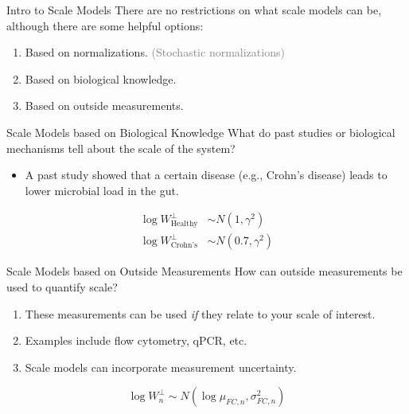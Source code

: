 \documentclass[
  ignorenonframetext,
]{beamer}
\providecommand{\tightlist}{%
  \setlength{\itemsep}{0pt}\setlength{\parskip}{0pt}}
\begin{document}
\begin{frame}{Intro to Scale Models}
\protect\hypertarget{intro-to-scale-models}{}
There are no restrictions on what scale models can be, although there
are some helpful options:

\vspace{.125in}

\begin{enumerate}
\tightlist
\item
  Based on normalizations. \textcolor{gray}{(Stochastic normalizations)}
\item
  Based on biological knowledge.
\item
  Based on outside measurements.
\end{enumerate}
\end{frame}

\begin{frame}{Scale Models based on Biological Knowledge}
\protect\hypertarget{scale-models-based-on-biological-knowledge}{}
What do past studies or biological mechanisms tell about the scale of
the system?

\vspace{.1in}

\pause

\begin{itemize}
\tightlist
\item
  A past study showed that a certain disease (e.g., Crohn's disease)
  leads to lower microbial load in the gut.
\end{itemize}

\pause

\begin{align*}
\log W^\perp_{\text{Healthy}} &\sim N(1, \gamma^2)\\
\log W^\perp_{\text{Crohn's}} &\sim N(0.7, \gamma^2)
\end{align*}
\end{frame}

\begin{frame}{Scale Models based on Outside Measurements}
\protect\hypertarget{scale-models-based-on-outside-measurements}{}
How can outside measurements be used to quantify scale?

\vspace{.1in}

\pause

\begin{enumerate}
\item
  These measurements can be used \emph{if} they relate to your scale of
  interest.
\item
  Examples include flow cytometry, qPCR, etc.
\item
  Scale models can incorporate measurement uncertainty.
\end{enumerate}

\pause

\begin{equation*}
\log W^\perp_{n} \sim N(\log \mu_{FC,n}, \sigma^{2}_{FC,n})
\end{equation*}
\end{frame}
\end{document}
